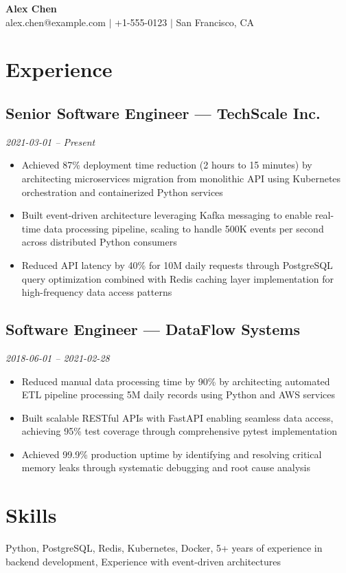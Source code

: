 \documentclass[11pt,a4paper]{article}
\begin{document}
\begin{center}
\textbf{\Large Alex Chen}\\[0.3em]
alex.chen@example.com $|$ +1-555-0123 $|$ San Francisco, CA
\end{center}

\section*{Experience}

\subsection*{Senior Software Engineer --- TechScale Inc.}
\textit{2021-03-01 -- Present}

\begin{itemize}
  \item Achieved 87\% deployment time reduction (2 hours to 15 minutes) by architecting microservices migration from monolithic API using Kubernetes orchestration and containerized Python services
  \item Built event-driven architecture leveraging Kafka messaging to enable real-time data processing pipeline, scaling to handle 500K events per second across distributed Python consumers
  \item Reduced API latency by 40\% for 10M daily requests through PostgreSQL query optimization combined with Redis caching layer implementation for high-frequency data access patterns
\end{itemize}

\subsection*{Software Engineer --- DataFlow Systems}
\textit{2018-06-01 -- 2021-02-28}

\begin{itemize}
  \item Reduced manual data processing time by 90\% by architecting automated ETL pipeline processing 5M daily records using Python and AWS services
  \item Built scalable RESTful APIs with FastAPI enabling seamless data access, achieving 95\% test coverage through comprehensive pytest implementation
  \item Achieved 99.9\% production uptime by identifying and resolving critical memory leaks through systematic debugging and root cause analysis
\end{itemize}

\section*{Skills}
Python, PostgreSQL, Redis, Kubernetes, Docker, 5+ years of experience in backend development, Experience with event-driven architectures
\end{document}

